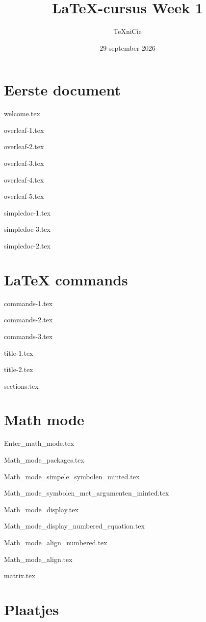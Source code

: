 \documentclass[allauthors,dutch]{../../../cursuspresentatie3}
\title{\LaTeX{}-cursus Week 1}
\author{\TeX niCie}
\date{29 september 2026}
\def\importslidei#1#2{%
	{#2}
}
\def\importslidek#1#2{%
	{#2}
}
\def\importslidey#1#2{%
	{#2}
}
\begin{document}
\section{Eerste document}
\def\placetarget{\hypertarget{eerste_document}{}}
\importslidek{beginners_NL}{welcome.tex}
\importslidek{beginners_NL}{overleaf-1.tex}
\importslidek{beginners_NL}{overleaf-2.tex}
\importslidek{beginners_NL}{overleaf-3.tex}
\importslidek{beginners_NL}{overleaf-4.tex}
\importslidek{beginners_NL}{overleaf-5.tex}

\importslidek{beginners_NL}{simpledoc-1.tex}
\importslidek{beginners_NL}{simpledoc-3.tex}
\importslidek{beginners_NL}{simpledoc-2.tex}

\section{LaTeX commands}
\def\placetarget{\hypertarget{commands}{}}

\importslidek{beginners_NL}{commands-1.tex}
\importslidek{beginners_NL}{commands-2.tex}
\importslidek{beginners_NL}{commands-3.tex}

\importslidek{beginners_NL}{title-1.tex}
\importslidek{beginners_NL}{title-2.tex}

\importslidek{beginners_NL}{sections.tex}

\section{Math mode}
\def\placetarget{\hypertarget{math_mode}{}}

\importslidei{2025-eerstejaars_cursus_1}{Enter_math_mode.tex}
\importslidei{2025-eerstejaars_cursus_1}{Math_mode_packages.tex}
\importslidei{2025-eerstejaars_cursus_1}{Math_mode_simpele_symbolen_minted.tex}
\importslidei{2025-eerstejaars_cursus_1}{Math_mode_symbolen_met_argumenten_minted.tex}
\importslidei{2025-eerstejaars_cursus_1}{Math_mode_display.tex}
\importslidei{2025-eerstejaars_cursus_1}{Math_mode_display_numbered_equation.tex}

\importslidei{2025-eerstejaars_cursus_1}{Math_mode_align_numbered.tex}
\importslidei{2025-eerstejaars_cursus_1}{Math_mode_align.tex}

\importslidey{2026-eerstejaars-cursus-1}{matrix.tex}

\section{Plaatjes}
\def\placetarget{\hypertarget{plaatjes}{}}
\end{document}
